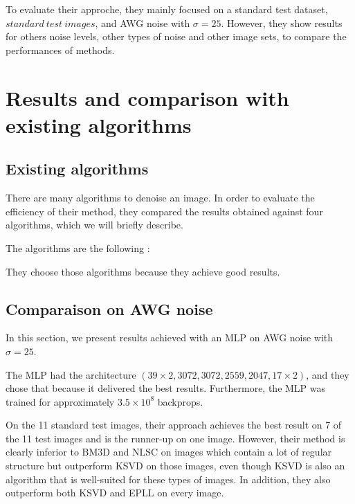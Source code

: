 \documentclass[10pt,a4paper]{article}
\newcommand{\svs}{\vspace{9pt}}
\begin{document}
\svs 

To evaluate their approche, they mainly focused on a standard test dataset, $standard\ test\ images$, and AWG noise with $\sigma=25$. However, they show results for others noise levels, other types of noise and other image sets, to compare the performances of methods.




\section{Results and comparison with existing algorithms}



\subsection{Existing algorithms}

There are many algorithms to denoise an image. In order to evaluate the efficiency of their method, they compared the results obtained against four algorithms, which we will briefly describe.

\svs

The algorithms are the following :



They choose those algorithms because they achieve good results.


\subsection{Comparaison on AWG noise}

In this section, we present results achieved with an MLP on AWG noise with $\sigma=25$.

\svs 

The MLP had the architecture $(39 \times 2, 3072, 3072, 2559, 2047, 17 \times 2)$, and they chose that because it delivered the best results. Furthermore, the MLP was trained for approximately $3.5 \times 10^8$ backprops.

\svs 

On the 11 standard test images, their approach achieves the best result on 7 of the 11 test images and is the runner-up on one image. However, their method is clearly inferior to BM3D and NLSC on images which contain a lot of regular structure but outperform KSVD on those images, even though KSVD is also an algorithm that is well-suited for these types of images. In addition, they also outperform both KSVD and EPLL on every
image.
\end{document}
